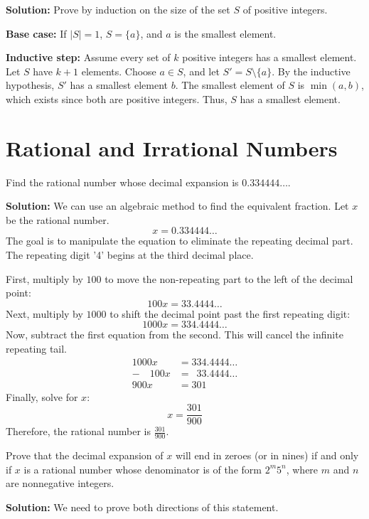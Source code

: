\textbf{Solution:}
Prove by induction on the size of the set $S$ of positive integers.

\textbf{Base case:} If $|S| = 1$, $S = \{a\}$, and $a$ is the smallest element.

\textbf{Inductive step:} Assume every set of $k$ positive integers has a smallest element. Let $S$ have $k+1$ elements. Choose $a \in S$, and let $S' = S \setminus \{a\}$. By the inductive hypothesis, $S'$ has a smallest element $b$. The smallest element of $S$ is $\min(a, b)$, which exists since both are positive integers. Thus, $S$ has a smallest element.


\section{Rational and Irrational Numbers}
\begin{problembox}
Find the rational number whose decimal expansion is $0.334444\ldots$.
\end{problembox}

\textbf{Solution:}
We can use an algebraic method to find the equivalent fraction. Let $x$ be the rational number.
$$x = 0.334444\ldots$$
The goal is to manipulate the equation to eliminate the repeating decimal part. The repeating digit '4' begins at the third decimal place.

First, multiply by $100$ to move the non-repeating part to the left of the decimal point:
$$100x = 33.4444\ldots$$
Next, multiply by $1000$ to shift the decimal point past the first repeating digit:
$$1000x = 334.4444\ldots$$
Now, subtract the first equation from the second. This will cancel the infinite repeating tail.
\begin{align*}
1000x &= 334.4444\ldots \\
-\quad 100x &= \phantom{0}33.4444\ldots \\
\hline
900x &= 301
\end{align*}
Finally, solve for $x$:
$$x = \frac{301}{900}$$
Therefore, the rational number is $\frac{301}{900}$.

\begin{problembox}
Prove that the decimal expansion of $x$ will end in zeroes (or in nines) if and only if $x$ is a rational number whose denominator is of the form $2^m 5^n$, where $m$ and $n$ are nonnegative integers.
\end{problembox}

\textbf{Solution:}
We need to prove both directions of this statement.

